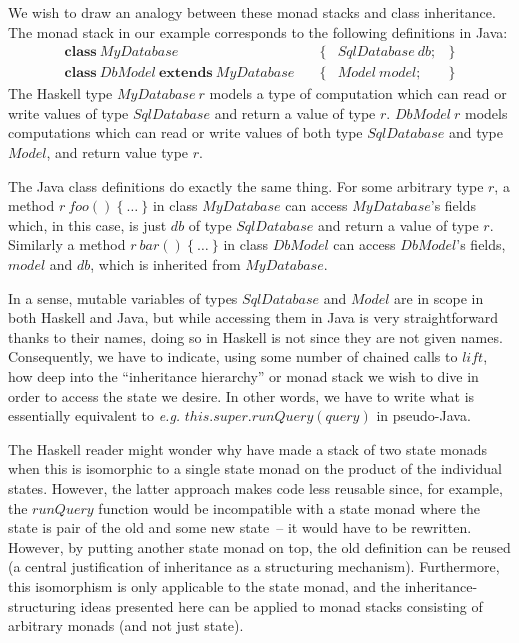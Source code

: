 We wish to draw an analogy between these monad stacks and class inheritance. The monad stack in our example corresponds to the following definitions in Java:
\begin{displaymath}
\begin{array}{lclc}
\mathbf{class}~\mathit{MyDatabase} & \quad \{ & \mathit{SqlDatabase}~\mathit{db}; & \} \\
\mathbf{class}~\mathit{DbModel}~\mathbf{extends}~\mathit{MyDatabase} & \quad \{ & \mathit{Model}~\mathit{model}; & \}
\end{array}
\end{displaymath}
The Haskell type $\mathit{MyDatabase}~r$ models a type of computation which can read or write values of type $\mathit{SqlDatabase}$ and return a value of type $r$. $\mathit{DbModel}~r$ models computations which can read or write values of both type $\mathit{SqlDatabase}$ and type $\mathit{Model}$, and return value type $r$.

The Java class definitions do exactly the same thing. For some arbitrary type $r$, a method $r~\mathit{foo}()~\{~\ldots~\}$ in class $\mathit{MyDatabase}$ can access $\mathit{MyDatabase}$'s fields which, in this case, is just $\mathit{db}$ of type $\mathit{SqlDatabase}$ and return a value of type $r$.  Similarly a method $r~\mathit{bar}()~\{~\ldots~\}$ in class $\mathit{DbModel}$ can access $\mathit{DbModel}$'s fields, $\mathit{model}$ and $\mathit{db}$, which is inherited from $\mathit{MyDatabase}$. 

In a sense, mutable variables of types $\mathit{SqlDatabase}$ and $\mathit{Model}$ are in scope in both Haskell and Java, but while accessing them in Java is very straightforward thanks to their names, doing so in Haskell is not since they are not given names. Consequently, we have to indicate, using some number of chained calls to $\mathit{lift}$, how deep into the ``inheritance hierarchy'' or monad stack we wish to dive in order to access the state we desire. In other words, we have to write what is essentially equivalent to \emph{e.g.} $\mathit{this}.\mathit{super}.\mathit{runQuery}(\mathit{query})$ in pseudo-Java. 

The Haskell reader might wonder why have made a stack of two state monads
when this is isomorphic to a single state monad on the product of the
individual states.
However, the latter approach makes code less reusable since, for example, the $\mathit{runQuery}$ function would be incompatible with a state monad where the state is pair of the old and some new state~-- it would have to be rewritten. However, by putting another state monad on top, the old definition can be reused
(a central justification of inheritance as a structuring mechanism).
Furthermore, this isomorphism is only applicable to the state monad, and
the inheritance-structuring ideas presented here can be applied to monad stacks consisting of arbitrary monads (and not just state).

